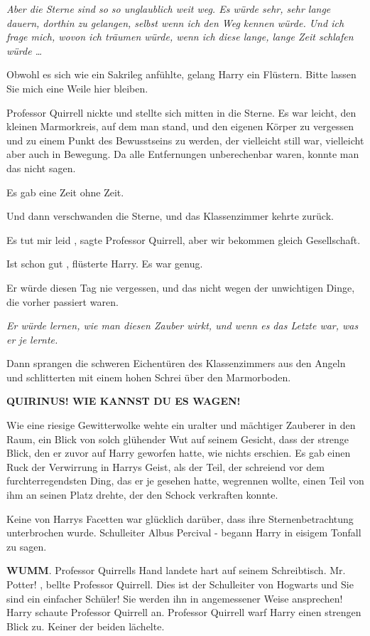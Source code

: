 \emph{Aber die Sterne sind so so unglaublich weit weg. Es würde sehr, sehr lange
dauern, dorthin zu gelangen, selbst wenn ich den Weg kennen würde. Und ich frage
mich, wovon ich träumen würde, wenn ich diese lange, lange Zeit schlafen würde
…\grqq{} }

Obwohl es sich wie ein Sakrileg anfühlte, gelang Harry ein Flüstern. \glqq Bitte
lassen Sie mich eine Weile hier bleiben.\grqq{}

Professor Quirrell nickte und stellte sich mitten in die Sterne. Es war leicht,
den kleinen Marmorkreis, auf dem man stand, und den eigenen Körper zu vergessen
und zu einem Punkt des Bewusstseins zu werden, der vielleicht still war,
vielleicht aber auch in Bewegung. Da alle Entfernungen unberechenbar waren,
konnte man das nicht sagen.

Es gab eine Zeit ohne Zeit.

Und dann verschwanden die Sterne, und das Klassenzimmer kehrte zurück.

\glqq Es tut mir leid\grqq{} , sagte Professor Quirrell, \glqq aber wir bekommen
gleich Gesellschaft.\grqq{}

\glqq Ist schon gut\grqq{} , flüsterte Harry. \glqq Es war genug.\grqq{}

Er würde diesen Tag nie vergessen, und das nicht wegen der unwichtigen Dinge,
die vorher passiert waren.

\emph{Er würde lernen, wie man diesen Zauber wirkt, und wenn es das Letzte war,
was er je lernte. }

Dann sprangen die schweren Eichentüren des Klassenzimmers aus den Angeln und
schlitterten mit einem hohen Schrei über den Marmorboden.

\textbf{ \glqq QUIRINUS! WIE KANNST DU ES WAGEN!\grqq{} }

Wie eine riesige Gewitterwolke wehte ein uralter und mächtiger Zauberer in den
Raum, ein Blick von solch glühender Wut auf seinem Gesicht, dass der strenge
Blick, den er zuvor auf Harry geworfen hatte, wie nichts erschien. Es gab einen
Ruck der Verwirrung in Harrys Geist, als der Teil, der schreiend vor dem
furchterregendsten Ding, das er je gesehen hatte, wegrennen wollte, einen Teil
von ihm an seinen Platz drehte, der den Schock verkraften konnte.

Keine von Harrys Facetten war glücklich darüber, dass ihre Sternenbetrachtung
unterbrochen wurde. \glqq Schulleiter Albus Percival -\grqq{} begann Harry in
eisigem Tonfall zu sagen.

\textbf{WUMM}. Professor Quirrells Hand landete hart auf seinem Schreibtisch.
\glqq Mr. Potter!\grqq{} , bellte Professor Quirrell. \glqq Dies ist der
Schulleiter von Hogwarts und Sie sind ein einfacher Schüler! Sie werden ihn in
angemessener Weise ansprechen!\grqq{} Harry schaute Professor Quirrell an.
Professor Quirrell warf Harry einen strengen Blick zu. Keiner der beiden
lächelte.

